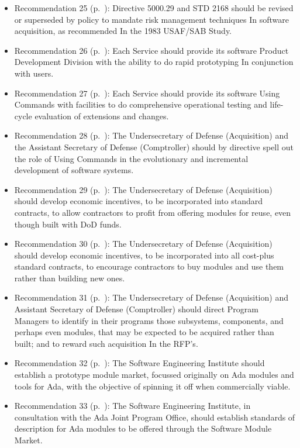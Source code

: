 \documentclass[12pt,final]{article}
\begin{document}
\begin{itemize}
    \item Recommendation 25 (p.~\pageref{rec:25}): Directive 5000.29 and STD 2168 should be revised or superseded by policy to mandate risk management techniques In software acquisition, as recommended In the 1983 USAF/SAB Study.
    \item Recommendation 26 (p.~\pageref{rec:26}): Each Service should provide its software Product Development Division with the ability to do rapid prototyping In conjunction with users.
    \item Recommendation 27 (p.~\pageref{rec:27}): Each Service should provide its software Using Commands with facilities to do comprehensive operational testing and life-cycle evaluation of extensions and changes.
    \item Recommendation 28 (p.~\pageref{rec:28}): The Undersecretary of Defense (Acquisition) and the Assistant Secretary of Defense (Comptroller) should by directive spell out the role of Using Commands in the evolutionary and incremental development of software systems.
    \item Recommendation 29 (p.~\pageref{rec:29}): The Undersecretary of Defense (Acquisition) should develop economic incentives, to be incorporated into standard contracts, to allow contractors to profit from offering modules for reuse, even though built with DoD funds.
    \item Recommendation 30 (p.~\pageref{rec:30}): The Undersecretary of Defense (Acquisition) should develop economic incentives, to be incorporated into all cost-plus standard contracts, to encourage contractors to buy modules and use them rather than building new ones.
    \item Recommendation 31 (p.~\pageref{rec:31}): The Undersecretary of Defense (Acquisition) and Assistant Secretary of Defense (Comptroller) should direct Program Managers to identify in their programs those subsystems, components, and perhaps even modules, that may be expected to be acquired rather than built; and to reward such acquisition In the RFP’s.
    \item Recommendation 32 (p.~\pageref{rec:32}): The Software Engineering Institute should establish a prototype module market, focussed originally on Ada modules and tools for Ada, with the objective of spinning it off when commercially viable.
    \item Recommendation 33 (p.~\pageref{rec:33}): The Software Engineering Institute, in consultation with the Ada Joint Program Office, should establish standards of description for Ada modules to be offered through the Software Module Market.

\end{itemize}
\end{document}
